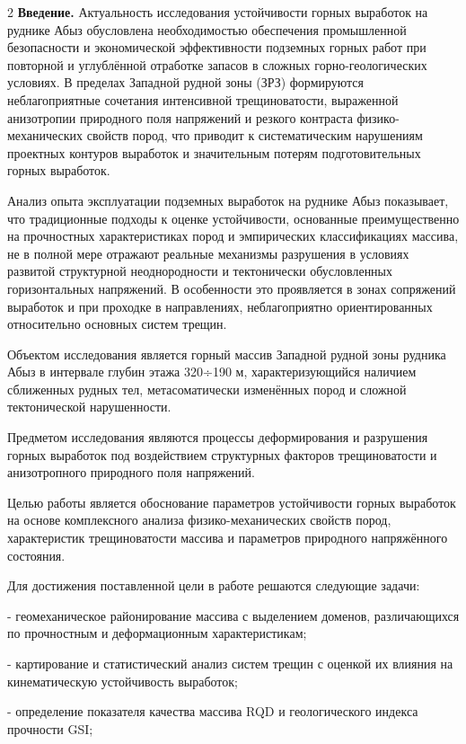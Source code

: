 \begin{multicols}{2}
{\bfseries Введение.} Актуальность исследования устойчивости горных
выработок на руднике Абыз обусловлена необходимостью обеспечения
промышленной безопасности и экономической эффективности подземных горных
работ при повторной и углублённой отработке запасов в сложных
горно-геологических условиях. В пределах Западной рудной зоны (ЗРЗ)
формируются неблагоприятные сочетания интенсивной трещиноватости,
выраженной анизотропии природного поля напряжений и резкого контраста
физико-механических свойств пород, что приводит к систематическим
нарушениям проектных контуров выработок и значительным потерям
подготовительных горных выработок.

Анализ опыта эксплуатации подземных выработок на руднике Абыз
показывает, что традиционные подходы к оценке устойчивости, основанные
преимущественно на прочностных характеристиках пород и эмпирических
классификациях массива, не в полной мере отражают реальные механизмы
разрушения в условиях развитой структурной неоднородности и тектонически
обусловленных горизонтальных напряжений. В особенности это проявляется в
зонах сопряжений выработок и при проходке в направлениях, неблагоприятно
ориентированных относительно основных систем трещин.

Объектом исследования является горный массив Западной рудной зоны
рудника Абыз в интервале глубин этажа 320÷190 м, характеризующийся
наличием сближенных рудных тел, метасоматически изменённых пород и
сложной тектонической нарушенности.

Предметом исследования являются процессы деформирования и разрушения
горных выработок под воздействием структурных факторов трещиноватости и
анизотропного природного поля напряжений.

Целью работы является обоснование параметров устойчивости горных
выработок на основе комплексного анализа физико-механических свойств
пород, характеристик трещиноватости массива и параметров природного
напряжённого состояния.

Для достижения поставленной цели в работе решаются следующие задачи:

- геомеханическое районирование массива с выделением доменов,
различающихся по прочностным и деформационным характеристикам;

- картирование и статистический анализ систем трещин с оценкой их
влияния на кинематическую устойчивость выработок;

- определение показателя качества массива RQD и геологического индекса
прочности GSI;


\end{multicols}
